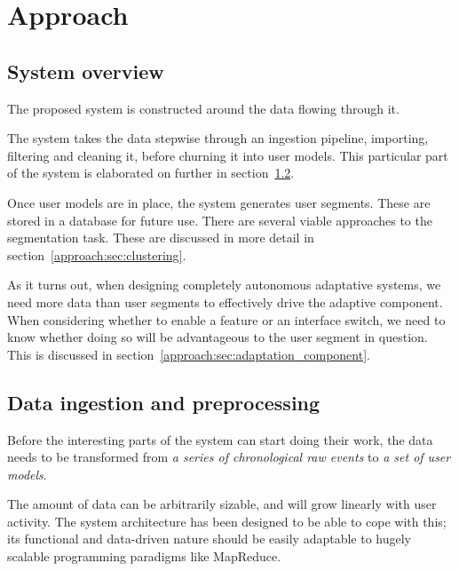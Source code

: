 \chapter{Approach}

\label{Chapter3}


\section{System overview} %
\label{approach:sec:system_overview}

The proposed system is constructed around the data flowing through it.

The system takes the data stepwise through an ingestion pipeline, importing, filtering and cleaning it, before churning it into user models. This particular part of the system is elaborated on further in section~\ref{approach:sec:data_ingestion_and_preprocessing}.

Once user models are in place, the system generates user segments. These are stored in a database for future use. There are several viable approaches to the segmentation task. These are discussed in more detail in section~\ref{approach:sec:clustering}.

As it turns out, when designing completely autonomous adaptative systems, we need more data than user segments to effectively drive the adaptive component. When considering whether to enable a feature or an interface switch, we need to know whether doing so will be advantageous to the user segment in question. This is discussed in section~\ref{approach:sec:adaptation_component}.


\section{Data ingestion and preprocessing} %
\label{approach:sec:data_ingestion_and_preprocessing}

Before the interesting parts of the system can start doing their work, the data needs to be transformed from \emph{a series of chronological raw events} to \emph{a set of user models}.

The amount of data can be arbitrarily sizable, and will grow linearly with user activity. The system architecture has been designed to be able to cope with this; its functional and data-driven nature should be easily adaptable to hugely scalable programming paradigms like MapReduce.

